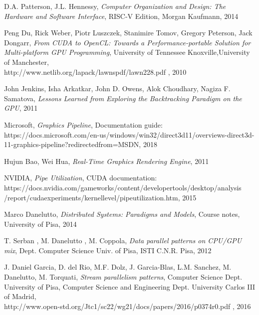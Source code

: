 \documentclass[12pt]{report}
\begin{document}
    
	\begin{thebibliography}{9}
		D.A. Patterson, J.L. Hennessy, 
		\textit{Computer Organization and Design: The Hardware and Software Interface}, RISC-V Edition, Morgan Kaufmann, 2014
	
	
		Peng Du, Rick Weber, Piotr Luszczek, Stanimire Tomov, Gregory Peterson, Jack Dongarr, 
		\textit{From CUDA to OpenCL: Towards a Performance-portable Solution for Multi-platform GPU Programming}, University of Tennessee Knoxville,University of Manchester,\\ http://www.netlib.org/lapack/lawnspdf/lawn228.pdf , 2010
		
		
		John Jenkins, Isha Arkatkar, John D. Owens, Alok Choudhary, Nagiza F. Samatova, 
		\textit{Lessons Learned from Exploring the Backtracking Paradigm on the GPU}, 2011
		
		Microsoft, \textit{Graphics Pipeline}, Documentation guide:\\
		https://docs.microsoft.com/en-us/windows/win32/direct3d11/overviews-direct3d-11-graphics-pipeline?redirectedfrom=MSDN, 2018
		
		Hujun Bao, Wei Hua, \textit{Real-Time Graphics Rendering Engine}, 2011
		
		NVIDIA, \textit{Pipe Utilization}, CUDA documentation:\\
		https://docs.nvidia.com/gameworks/content/developertools/desktop/analysis\\/report/cudaexperiments/kernellevel/pipeutilization.htm, 2015
		
		
		Marco Danelutto,
		\textit{Distributed Systems: Paradigms and Models}, Course notes, University of Pisa, 2014
		
		
		
		T. Serban , M. Danelutto , M. Coppola, \textit{Data parallel patterns on CPU/GPU mix}, Dept. Computer Science Univ. of Pisa, ISTI C.N.R. Pisa, 2012
	
		J. Daniel Garcia, D. del Rio, M.F. Dolz, J. Garcia-Blas, L.M. Sanchez, M. Danelutto, M. Torquati, \textit{Stream parallelism patterns}, Computer Science Dept. University of Pisa, Computer Science and Engineering Dept. University Carlos III of Madrid,\\
		http://www.open-std.org/Jtc1/sc22/wg21/docs/papers/2016/p0374r0.pdf , 2016
		

\end{thebibliography}
\end{document}
